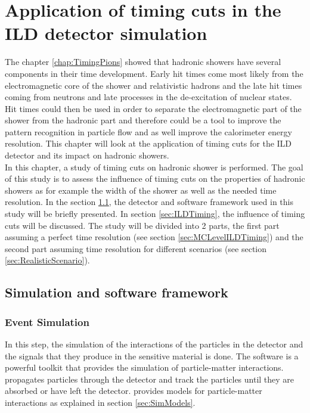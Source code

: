 \chapter{Application of timing cuts in the ILD detector simulation}
\label{chap:ILDTiming}

The chapter \ref{chap:TimingPions} showed that hadronic showers have several components in their time development. Early hit times come most likely from the electromagnetic core of the shower and relativistic hadrons and the late hit times coming from neutrons and late processes in the de-excitation of nuclear states. Hit times could then be used in order to separate the electromagnetic part of the shower from the hadronic part and therefore could be a tool to improve the pattern recognition in particle flow and as well improve the calorimeter energy resolution. This chapter will look at the application of timing cuts for the ILD detector and its impact on hadronic showers.\\

In this chapter, a study of timing cuts on hadronic shower is performed. The goal of this study is to assess the influence of timing cuts on the properties of hadronic showers as for example the width of the shower as well as the needed time resolution. In the section \ref{sec:Framework}, the detector and software framework used in this study will be briefly presented. In section \ref{sec:ILDTiming}, the influence of timing cuts will be discussed. The study will be divided into 2 parts, the first part assuming a perfect time resolution (see section \ref{sec:MCLevelILDTiming}) and the second part assuming time resolution for different scenarios (see section \ref{sec:RealisticScenario}).

\section{Simulation and software framework}
\label{sec:Framework}

\subsection{Event Simulation}

In this step, the simulation of the interactions of the particles in the detector and the signals that they produce in the sensitive material is done. The \geant software is a powerful toolkit that provides the simulation of particle-matter interactions. \geant propagates particles through the detector and track the particles until they are absorbed or have left the detector. \geant provides models for particle-matter interactions as explained in section \ref{sec:SimModels}.

